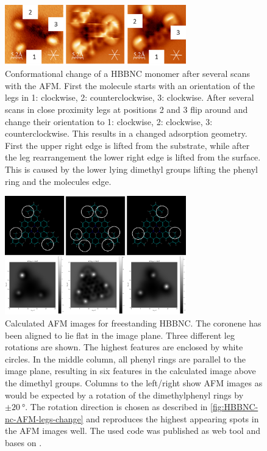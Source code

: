 \begin{figure}[] \centering
	\includegraphics[width=0.7\textwidth]{./images/hbbnc-ag-111-leg-flip}
	\caption{Conformational change of a HBBNC monomer after several scans with the AFM. First the molecule starts with an orientation of the legs in 1: clockwise, 2: counterclockwise, 3: clockwise. After several scans in close proximity legs at positions 2 and 3 flip around and change their orientation to 1: clockwise, 2: clockwise, 3: counterclockwise. This results in a changed adsorption geometry. First the upper right edge is lifted from the substrate, while after the leg rearrangement the lower right edge is lifted from the surface. This is caused by the lower lying dimethyl groups lifting the phenyl ring and the molecules edge.}
	\label{fig:HBBNC-nc-AFM-legs-change}
\end{figure}

\begin{figure}[] \centering
	\includegraphics[width=0.7\textwidth]{./images/Simulated-AFM-flipping-legs}
	\caption{Calculated AFM images for freestanding HBBNC. The coronene has been aligned to lie flat in the image plane. Three different leg rotations are shown. The highest features are enclosed by white circles. In the middle column, all phenyl rings are parallel to  the image plane, resulting in six features in the calculated image above the dimethyl groups. Columns to the left/right show AFM images as would be expected by a rotation of the dimethylphenyl rings by $\pm \SI{20}{\degree}$. The rotation direction is chosen as described in \autoref{fig:HBBNC-nc-AFM-legs-change} and reproduces the highest appearing spots in the AFM images well. The used code was published as web tool \cite{_AFM_calc} and bases on  \cite{hapala_origin_2014,hapala_mechanism_2014}.}
	\label{fig:HBBNC-nc-AFM-legs-change-calc}
\end{figure}


